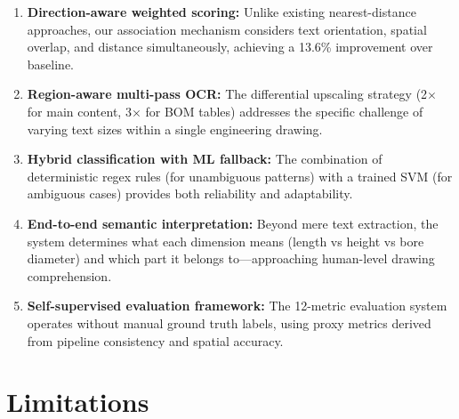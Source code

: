 \documentclass[12pt,a4paper]{article}
\begin{document}
\begin{enumerate}
    \item \textbf{Direction-aware weighted scoring:} Unlike existing nearest-distance approaches, our association mechanism considers text orientation, spatial overlap, and distance simultaneously, achieving a 13.6\% improvement over baseline.
    
    \item \textbf{Region-aware multi-pass OCR:} The differential upscaling strategy (2$\times$ for main content, 3$\times$ for BOM tables) addresses the specific challenge of varying text sizes within a single engineering drawing.
    
    \item \textbf{Hybrid classification with ML fallback:} The combination of deterministic regex rules (for unambiguous patterns) with a trained SVM (for ambiguous cases) provides both reliability and adaptability.
    
    \item \textbf{End-to-end semantic interpretation:} Beyond mere text extraction, the system determines what each dimension means (length vs height vs bore diameter) and which part it belongs to---approaching human-level drawing comprehension.
    
    \item \textbf{Self-supervised evaluation framework:} The 12-metric evaluation system operates without manual ground truth labels, using proxy metrics derived from pipeline consistency and spatial accuracy.
\end{enumerate}

\section{Limitations}
\end{document}
